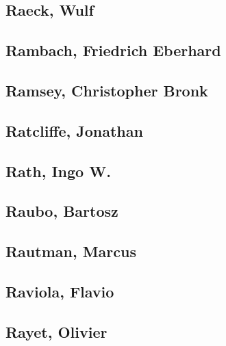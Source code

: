 
\subsection[Raeck, Wulf (1)]{Raeck, Wulf}

\subsection[Rambach, Friedrich Eberhard (1)]{Rambach, Friedrich Eberhard}

\subsection[Ramsey, Christopher Bronk (1)]{Ramsey, Christopher Bronk}

\subsection[Ratcliffe, Jonathan (1)]{Ratcliffe, Jonathan}

\subsection[Rath, Ingo W. (1)]{Rath, Ingo W.}

\subsection[Raubo, Bartosz (1)]{Raubo, Bartosz}

\subsection[Rautman, Marcus (1)]{Rautman, Marcus}

\subsection[Raviola, Flavio (1)]{Raviola, Flavio}

\subsection[Rayet, Olivier (2)]{Rayet, Olivier}

